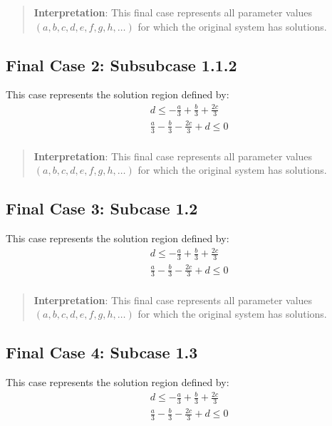 \documentclass{article}
\newenvironment{stepdetail}
  {\begin{quote}\small\color{blue}}
  {\end{quote}}
\begin{document}
\begin{stepdetail}
\textbf{Interpretation}: This final case represents all parameter values
$(a, b, c, d, e, f, g, h, \ldots)$ for which the original system has solutions.
\end{stepdetail}

\subsection{Final Case 2: Subsubcase 1.1.2}

This case represents the solution region defined by:
\begin{align}
& d \leq - \frac{a}{3} + \frac{b}{3} + \frac{2 c}{3} \\
& \frac{a}{3} - \frac{b}{3} - \frac{2 c}{3} + d \leq 0 \\
\end{align}

\begin{stepdetail}
\textbf{Interpretation}: This final case represents all parameter values
$(a, b, c, d, e, f, g, h, \ldots)$ for which the original system has solutions.
\end{stepdetail}

\subsection{Final Case 3: Subcase 1.2}

This case represents the solution region defined by:
\begin{align}
& d \leq - \frac{a}{3} + \frac{b}{3} + \frac{2 c}{3} \\
& \frac{a}{3} - \frac{b}{3} - \frac{2 c}{3} + d \leq 0 \\
\end{align}

\begin{stepdetail}
\textbf{Interpretation}: This final case represents all parameter values
$(a, b, c, d, e, f, g, h, \ldots)$ for which the original system has solutions.
\end{stepdetail}

\subsection{Final Case 4: Subcase 1.3}

This case represents the solution region defined by:
\begin{align}
& d \leq - \frac{a}{3} + \frac{b}{3} + \frac{2 c}{3} \\
& \frac{a}{3} - \frac{b}{3} - \frac{2 c}{3} + d \leq 0 \\
\end{align}
\end{document}
